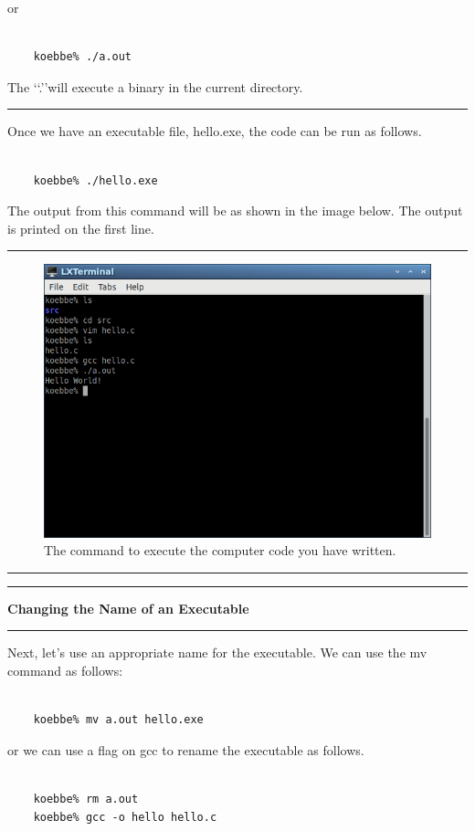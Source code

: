 \documentclass[10pt,fleqn]{article}
\begin{document}
or
\begin{verbatim}

    koebbe% ./a.out

\end{verbatim}
The \lq\lq .\/\rq\rq will execute a binary in the current directory.
\vskip0.1in\hrule\vskip0.1in
\noindent
Once we have an executable file, hello.exe, the code can be run as follows.
\begin{verbatim}

    koebbe% ./hello.exe

\end{verbatim}
The output from this command will be as shown in the image below. The output is
printed on the first line.
\vskip0.1in\hrule\vskip0.1in
\vfill
\begin{figure}[h]
\centering
\includegraphics[width=5.0in]{../images/hello_world_08.png}
\caption{The command to execute the computer code you have written.}
\end{figure}
\eject
\vskip0.1in\hrule\vskip0.1in
\vfill
\vskip0.1in\hrule\vskip0.1in \noindent
{\bf Changing the Name of an Executable} 
\vskip0.1in\hrule\vskip0.1in \noindent
Next, let's use an appropriate name for the executable. We can use the mv
command as follows:
\begin{verbatim}

    koebbe% mv a.out hello.exe

\end{verbatim}
or we can use a flag on gcc to rename the executable as follows.
\begin{verbatim}

    koebbe% rm a.out
    koebbe% gcc -o hello hello.c

\end{verbatim}
\end{document}
